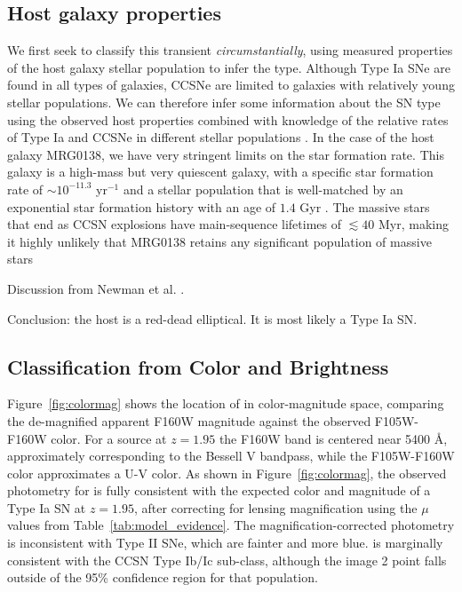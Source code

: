 \documentclass[twocolumn]{aastex63}
\begin{document}
\subsection{Host galaxy properties}
\label{ss:host}

We first seek to classify this transient {\it circumstantially}, using measured properties of the host galaxy stellar population to infer the type. Although Type Ia SNe are found in all types of galaxies, CCSNe are limited to galaxies with relatively young stellar populations.  We can therefore infer some information about the SN type using the observed host properties combined with knowledge of the relative rates of Type Ia and CCSNe in different stellar populations \citep{mannucci_rates_2005,foley_classifying_2013}.  In the case of the host galaxy MRG0138, we have very stringent limits on the star formation rate. This galaxy is a high-mass but very quiescent galaxy, with a specific star formation rate of $\sim10^{-11.3}$ yr$^{-1}$  and a stellar population that is well-matched by an exponential star formation history with an age of $1.4$ Gyr \cite{newman_resolving_2018}.  The massive stars that end as CCSN explosions have main-sequence lifetimes of $\lesssim 40$ Myr,  making it highly unlikely that MRG0138 retains any significant population of massive stars 


Discussion from Newman et al. \citep{newman_resolving_2018-1}.

Conclusion: the host is a red-dead elliptical. It is most likely a Type Ia SN.

\subsection{Classification from Color and Brightness}
\label{ss:lightcurve}

Figure~\ref{fig:colormag} shows the location of \SNABC in color-magnitude space, comparing the de-magnified apparent F160W magnitude against the observed F105W-F160W color.  
For a source at $z=1.95$ the F160W band is centered near 5400 \AA, approximately corresponding to the Bessell V bandpass, while the F105W-F160W color approximates a U-V color. 
As shown in Figure~\ref{fig:colormag}, the observed photometry for \SNABC is fully consistent with the expected color and magnitude of a Type Ia SN at $z=1.95$, after correcting for lensing magnification using the $\mu$ values from Table~\ref{tab:model_evidence}.  The magnification-corrected photometry is inconsistent with Type II SNe, which are fainter and more blue. \SNABC is marginally consistent with the CCSN Type Ib/Ic sub-class, although the image 2 point falls outside of the 95\% confidence region for that population.  
\end{document}
